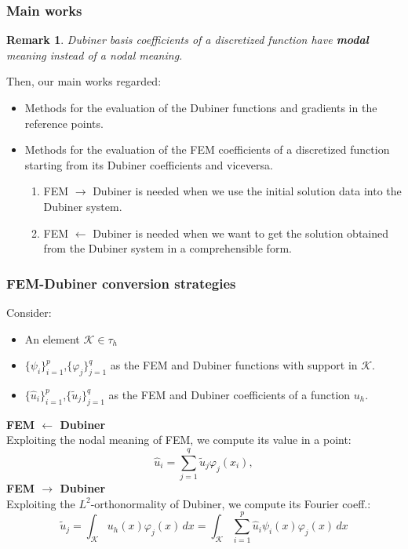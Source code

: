\documentclass[9pt]{beamer}
\newtheorem*{remark}{Remark}
\begin{document}
\begin{frame}
\frametitle{Main works}
\begin{remark}
	Dubiner basis coefficients of a discretized function have \textbf{modal} meaning instead of a \emph{nodal} meaning.
\end{remark}
Then, our main works regarded:
\begin{itemize}
	\item Methods for the evaluation of the Dubiner functions and gradients in the reference points.
	\item Methods for the evaluation of the FEM coefficients of a discretized function starting from its Dubiner coefficients and viceversa.
	\begin{enumerate}
		\item FEM $\rightarrow$ Dubiner is needed when we use the initial solution data into the Dubiner system.
		\item FEM $\leftarrow$ Dubiner is needed when we want to get the solution obtained from the Dubiner system in a comprehensible form. 
	\end{enumerate}
\end{itemize}
\end{frame}


\begin{frame}
\frametitle{FEM-Dubiner conversion strategies}
Consider:
\begin{itemize}
	\small
	\item An element $\mathcal{K}\in \tau_h$
	\item $\{\psi_{i}\}_{i=1}^{p}$,$\{\varphi_{j}\}_{j=1}^{q}$ as the FEM and Dubiner functions with support in $\mathcal{K}$. 
	\item $\{\hat{u}_i\}_{i=1}^p$,$\{\tilde{u}_j\}_{j=1}^q$ as the FEM and Dubiner coefficients of a function $u_h$.
\end{itemize} \vspace{4mm}
\textbf{FEM $\leftarrow$ Dubiner} \\
\small Exploiting the nodal meaning of FEM, we compute its value in a point: \normalsize
\begin{equation*} \label{ref3}
\hat{u}_i = \sum_{j=1}^q \tilde{u}_j\varphi_j(x_i),
\end{equation*}
\textbf{FEM $\rightarrow$ Dubiner} \\
\small Exploiting the $L^2$-orthonormality of Dubiner, we compute its Fourier coeff.: \normalsize
\begin{equation*}\label{ref4}
\tilde{u}_j = \int_\mathcal{K} u_h(x) \varphi_j(x) \,dx = \int_{\mathcal{K}} \sum_{i=1}^p \hat{u}_i\psi_i(x) \varphi_j(x) \,dx
\end{equation*}
\end{frame}
\end{document}
